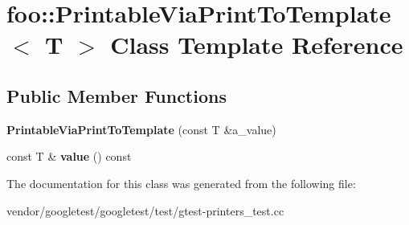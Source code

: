 \hypertarget{classfoo_1_1_printable_via_print_to_template}{}\section{foo\+:\+:Printable\+Via\+Print\+To\+Template$<$ T $>$ Class Template Reference}
\label{classfoo_1_1_printable_via_print_to_template}
\subsection*{Public Member Functions}
\begin{DoxyCompactItemize}
\item 
\mbox{\label{classfoo_1_1_printable_via_print_to_template_a8fef9e8b59c9415624230b73469b517e}} 
{\bfseries Printable\+Via\+Print\+To\+Template} (const T \&a\+\_\+value)
\item 
\mbox{\label{classfoo_1_1_printable_via_print_to_template_a14e0fcac9ae264e37e6212994b2920f6}} 
const T \& {\bfseries value} () const
\end{DoxyCompactItemize}


The documentation for this class was generated from the following file\+:\begin{DoxyCompactItemize}
\item 
vendor/googletest/googletest/test/gtest-\/printers\+\_\+test.\+cc\end{DoxyCompactItemize}
